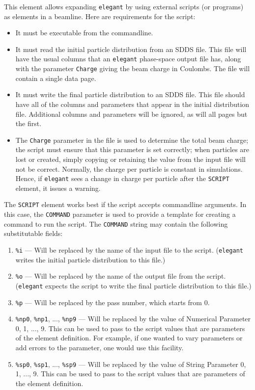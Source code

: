 This element allows expanding {\tt elegant} by using external scripts
(or programs) as elements in a beamline.    Here are requirements for the 
script:
\begin{itemize}
\item It must be executable from the commandline.
\item It must read the initial particle distribution from an SDDS file.
This file will have the usual columns that an {\tt elegant} phase-space
output file  has, along with the parameter {\tt Charge} giving the 
beam charge in Coulombs. The file will contain a single data page.
\item It must write the final particle distribution to an SDDS file.
This file should have all of the columns and parameters that appear in the
initial distribution file.  Additional columns and parameters will be ignored,
as will all pages but the first. 
\item The {\tt Charge} parameter in the file is used to determine the total beam charge; the script must ensure that
  this parameter is set correctly; when particles are lost or created, simply copying or retaining the value from the
  input file will not be correct. Normally, the charge per particle is constant in simulations. Hence, if {\tt elegant}
  sees a change in charge per particle after the {\tt SCRIPT} element, it issues a warning.
\end{itemize}

The {\tt SCRIPT} element works best if the script accepts commandline
arguments.  In this case, the {\tt COMMAND} parameter is used to
provide a template for creating a command to run the script.  The {\tt COMMAND}
string may contain the following substitutable fields:
\begin{enumerate}
\item \verb|%i| --- Will be replaced by the name of the input file to the script.
({\tt elegant} writes the initial particle distribution to this file.)
\item \verb|%o| --- Will be replaced by the name of the output file from the script.
({\tt elegant} expects the script to write the final particle distribution to this file.)
\item \verb|%p| --- Will be replaced by the pass number, which starts from 0.
\item \verb|%np0|, \verb|%np1|, ..., \verb|%np9| --- Will be replaced by the value of
 Numerical Parameter 0, 1, ..., 9.  This can be used to pass to the script values that
 are parameters of the element definition.  For example, if one wanted to vary parameters 
 or add errors to the parameter, one would use this facility.
\item \verb|%sp0|,  \verb|%sp1|, ..., \verb|%sp9| --- Will be replaced by the value of
 String Parameter 0, 1, ..., 9.  This can be used to pass to the script values that
 are parameters of the element definition. 
\end{enumerate}

